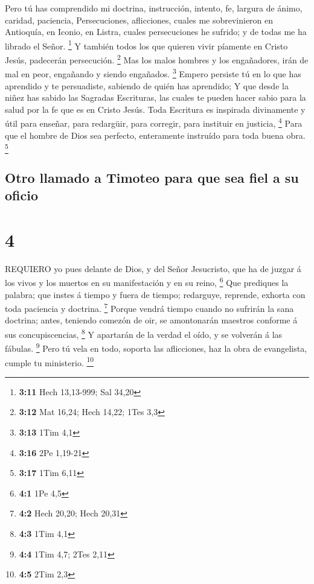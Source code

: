  Pero tú has comprendido mi doctrina, instrucción, intento,
fe, largura de ánimo, caridad, paciencia,  Persecuciones,
aflicciones, cuales me sobrevinieron en Antioquía, en Iconio, en Listra,
cuales persecuciones he sufrido; y de todas me ha librado el Señor.
\footnote{\textbf{3:11} Hech 13,13-999; Sal 34,20}  Y
también todos los que quieren vivir píamente en Cristo Jesús, padecerán
persecución. \footnote{\textbf{3:12} Mat 16,24; Hech 14,22; 1Tes 3,3}
 Mas los malos hombres y los engañadores, irán de mal en
peor, engañando y siendo engañados. \footnote{\textbf{3:13} 1Tim 4,1}
 Empero persiste tú en lo que has aprendido y te
persuadiste, sabiendo de quién has aprendido;  Y que desde
la niñez has sabido las Sagradas Escrituras, las cuales te pueden hacer
sabio para la salud por la fe que es en Cristo Jesús.  Toda
Escritura es inspirada divinamente y útil para enseñar, para redargüir,
para corregir, para instituir en justicia, \footnote{\textbf{3:16} 2Pe
  1,19-21}  Para que el hombre de Dios sea perfecto,
enteramente instruído para toda buena obra. \footnote{\textbf{3:17} 1Tim
  6,11}

\hypertarget{otro-llamado-a-timoteo-para-que-sea-fiel-a-su-oficio}{%
\subsection{Otro llamado a Timoteo para que sea fiel a su
oficio}\label{otro-llamado-a-timoteo-para-que-sea-fiel-a-su-oficio}}

\hypertarget{section-3}{%
\section{4}\label{section-3}}

 REQUIERO yo pues delante de Dios, y del Señor Jesucristo,
que ha de juzgar á los vivos y los muertos en su manifestación y en su
reino, \footnote{\textbf{4:1} 1Pe 4,5}  Que prediques la
palabra; que instes á tiempo y fuera de tiempo; redarguye, reprende,
exhorta con toda paciencia y doctrina. \footnote{\textbf{4:2} Hech
  20,20; Hech 20,31}  Porque vendrá tiempo cuando no
sufrirán la sana doctrina; antes, teniendo comezón de oir, se
amontonarán maestros conforme á sus concupiscencias, \footnote{\textbf{4:3}
  1Tim 4,1}  Y apartarán de la verdad el oído, y se volverán
á las fábulas. \footnote{\textbf{4:4} 1Tim 4,7; 2Tes 2,11} 
Pero tú vela en todo, soporta las aflicciones, haz la obra de
evangelista, cumple tu ministerio. \footnote{\textbf{4:5} 2Tim 2,3}

